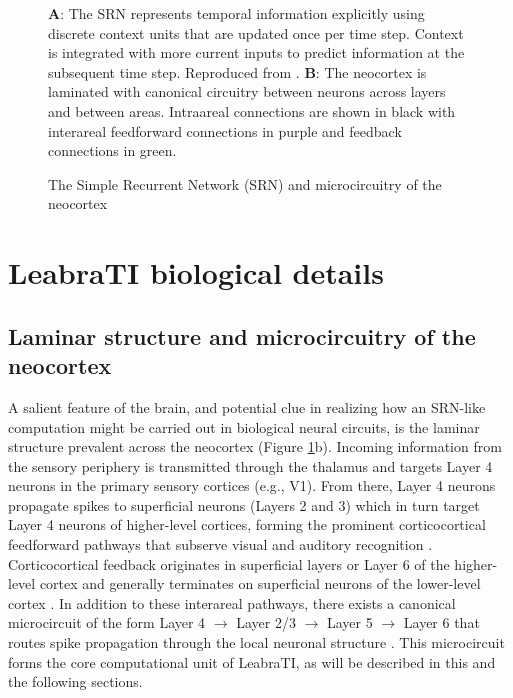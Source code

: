 \documentclass[dwyatte_dissertation.tex]{subfiles}
\begin{document}
\begin{figure}[h!]
\begin{center}
\begin{tabular}{ll}
\end{tabular}
\end{center}
\caption{The Simple Recurrent Network (SRN) and microcircuitry of the neocortex}{\textbf{A}: The SRN represents temporal information explicitly using discrete context units that are updated once per time step. Context is integrated with more current inputs to predict information at the subsequent time step. Reproduced from \protect{}. \textbf{B}: The neocortex is laminated with canonical circuitry between neurons across layers and between areas. Intraareal connections are shown in black with interareal feedforward connections in purple and feedback connections in green.}
\label{fig:srn_circuit}
\end{figure}

\section{LeabraTI biological details}
\subsection{Laminar structure and microcircuitry of the neocortex}

A salient feature of the brain, and potential clue in realizing how an SRN-like computation might be carried out in biological neural circuits, is the laminar structure prevalent across the neocortex (Figure \ref{fig:srn_circuit}b). Incoming information from the sensory periphery is transmitted through the thalamus and targets Layer 4 neurons in the primary sensory cortices (e.g., V1). From there, Layer 4 neurons propagate spikes to superficial neurons (Layers 2 and 3) which in turn target Layer 4 neurons of higher-level cortices, forming the prominent corticocortical feedforward pathways that subserve visual and auditory recognition \cite{FellemanVanEssen91}. Corticocortical feedback originates in superficial layers or Layer 6 of the higher-level cortex and generally terminates on superficial neurons of the lower-level cortex \cite{RocklandPandya79}. In addition to these interareal pathways, there exists a canonical microcircuit of the form Layer 4 $\rightarrow$ Layer 2/3 $\rightarrow$ Layer 5 $\rightarrow$ Layer 6 that routes spike propagation through the local neuronal structure \cite{DouglasMartin04,ThomsonLamy07}. This microcircuit forms the core computational unit of LeabraTI, as will be described in this and the following sections.
\end{document}
